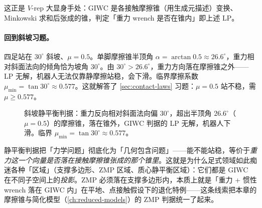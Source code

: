 \noindent 这正是 $V$-rep 大显身手处：GIWC 是各接触摩擦锥（用生成元描述）变换、Minkowski 求和后张成的锥，判定「重力 wrench 是否在锥内」即上述 LP。

\paragraph{回到斜坡习题。}
四足站在 $30^\circ$ 斜坡、$\mu=0.5$。单脚摩擦锥半顶角 $\alpha=\arctan0.5\approx26.6^\circ$，重力相对斜面法向的倾角恰为坡角 $30^\circ$。由 $30^\circ>26.6^\circ$，重力方向落在摩擦锥之外——LP 无解，机器人无法仅靠静摩擦站稳，会下滑。临界摩擦系数 $\mu_{\min}=\tan30^\circ\approx0.577$。这就解答了 \cref{sec:contact-laws} 习题：$\mu=0.5$ 站不稳，需 $\mu\ge0.577$。

\begin{figure}[ht]
\centering
{}
\caption{斜坡静平衡判据：重力反向相对斜面法向偏 $30^\circ$，超出半顶角 $26.6^\circ$（$\mu=0.5$）的摩擦锥，落在锥外，GIWC 判据的 LP 无解，机器人下滑。临界 $\mu_{\min}=\tan30^\circ\approx0.577$。}
\label{fig:slope-giwc}
\end{figure}

\begin{insight}
静平衡判据把「力学问题」彻底化为「几何包含问题」——能不能站稳，等价于\emph{重力这一个向量是否落在接触摩擦锥张成的那个锥里}。这就是为什么足式领域如此痴迷各种「区域」（支撑多边形、ZMP 区域、质心静平衡区域）：它们都是 GIWC 在不同子空间上的\emph{投影}。ZMP 必须落在支撑多边形内，本质上就是「重力 + 惯性 wrench 落在 GIWC 内」在平地、点接触假设下的退化特例——这条线索把本章的摩擦锥与简化模型（\cref{ch:reduced-models}）的 ZMP 判据统一了起来。
\end{insight}

